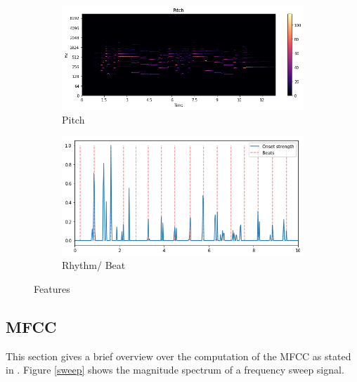 \begin{figure}[htbp]
{{			\begin{subfigure}{.495\textwidth}
				\centering
				\includegraphics[scale=0.3]{Images/Layla/laylapitch.png}
				\caption{Pitch}
				\label{laylapitch}
			\end{subfigure}%
			\begin{subfigure}{.495\textwidth}
				\centering     
				\includegraphics[scale=0.3]{Images/Layla/laylabeat.png}
				\caption{Rhythm/ Beat}
				\label{laylacbeat}
			\end{subfigure}%
	}}
	\caption{Features}
	\label{fig:feat2}
\end{figure}

\subsection{MFCC}\label{mfccsim}

This section gives a brief overview over the computation of the MFCC as stated in \cite[pp. 55ff]{knees1}.
Figure \ref{sweep} shows the magnitude spectrum of a frequency sweep signal.

